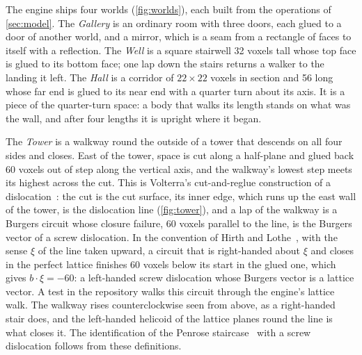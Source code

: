 \documentclass[10pt,a4paper]{article}
\begin{document}
The engine ships four worlds (\cref{fig:worlds}), each built from the operations of \cref{sec:model}. The
\emph{Gallery} is an ordinary room with three doors, each glued to a door of another world, and
a mirror, which is a seam from a rectangle of faces to itself with a reflection. The \emph{Well}
is a square stairwell 32 voxels tall whose top face is glued to its bottom face; one lap down the
stairs returns a walker to the landing it left. The \emph{Hall} is a corridor of $22 \times 22$
voxels in section and 56 long whose far end is glued to its near end with a quarter turn about
its axis. It is a piece of the quarter-turn space: a body that walks its length stands on what
was the wall, and after four lengths it is upright where it began.

The \emph{Tower} is a walkway round the outside of a tower that descends on all four sides and
closes. East of the tower, space is cut along a half-plane and glued back 60 voxels out of step
along the vertical axis, and the walkway's lowest step meets its highest across the cut. This is
Volterra's cut-and-reglue construction of a dislocation~\cite{volterra1907,kleman2008}: the cut
is the cut surface, its inner edge, which runs up the east wall of the tower, is the dislocation
line (\cref{fig:tower}), and a lap of the walkway is a Burgers circuit whose closure failure, 60 voxels parallel to the
line, is the Burgers vector of a screw dislocation. In the convention of Hirth and
Lothe~\cite[p.~22]{hirth1968}, with the sense $\xi$ of the line taken upward, a circuit that is
right-handed about $\xi$ and closes in the perfect lattice finishes 60 voxels below its start in
the glued one, which gives $b \cdot \xi = -60$: a left-handed screw dislocation whose Burgers
vector is a lattice vector. A test in the repository walks this circuit through the engine's
lattice walk. The walkway rises counterclockwise seen from above, as a right-handed stair does,
and the left-handed helicoid of the lattice planes round the line is what closes it. The
identification of the Penrose staircase~\cite{penrose1958} with a screw dislocation follows from these
definitions.
\end{document}
